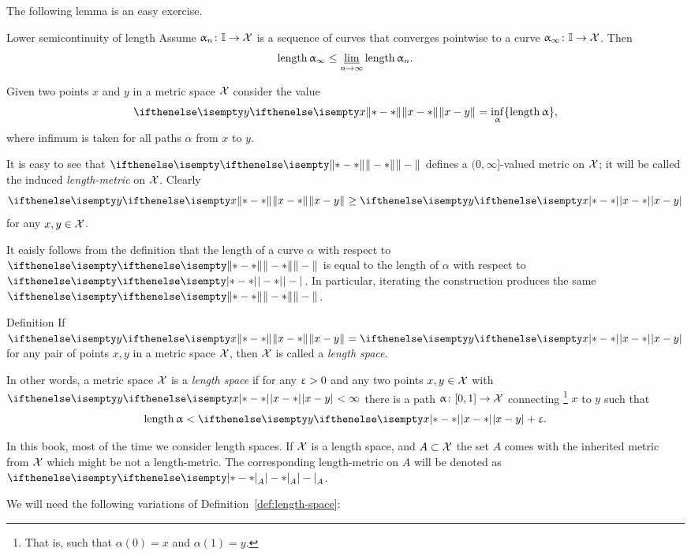 The following lemma is an easy exercise.

\begin{thm}{Lower semicontinuity of length}\label{thm:semicont-of-length}
Assume $\alpha_n\:\II\to \spc{X}$ is a sequence of curves that converges pointwise to a curve $\alpha_\infty\:\II\to \spc{X}$.
Then 
\[\length\alpha_\infty\le \liminf_{n\to\infty}\length\alpha_n.\]

\end{thm}

Given two points $x$ and $y$ in a metric space $\mathcal{X}$
consider the value
\[\yetdist{x}{y}{}=\inf_{\alpha}\{\length\alpha\},\]
where infimum is taken for all paths $\alpha$ from $x$ to $y$.

It is easy to see that $\yetdist{}{}{}$ defines a $(0,\infty]$-valued metric on  $\mathcal{X}$;
it will be called the induced \emph{length-metric} on $\mathcal{X}$.
Clearly 
\[\yetdist{x}{y}{}\ge \dist{x}{y}{}\]
for any $x,y\in \spc{X}$.

It  eaisly follows from the definition that the length of a curve $\alpha$ with respect to $\yetdist{}{}{}$ is equal to the length of $\alpha$ with respect to $\dist{}{}{}$. In particular, iterating the construction produces the same $\yetdist{}{}{}$.

\begin{thm}{Definition}\label{def:length-space}
If $\yetdist{x}{y}{}=\dist{x}{y}{}$ for any pair of points $x,y$ in a metric space $\mathcal{X}$, then $\mathcal{X}$ is called a \emph{length space}.
\end{thm}

In other words, a metric space $\mathcal{X}$ is a
\emph{length space}
if for any $\upvarepsilon>0$ and any two points $x,y\in \spc{X}$ with $\dist{x}{y}{}<\infty$ there is a path $\alpha\:[0,1]\to\spc{X}$ connecting%
\footnote{That is, such that $\alpha(0)=x$ and $\alpha(1)=y$.}
 $x$ to $y$
such that 
\[\length\alpha<\dist{x}{y}{}+\eps.\]

In this book, most of the time we consider length spaces.
If $\mathcal{X}$ is a length space, 
and $A\subset \spc{X}$ the set $A$ comes with the inherited metric from $\mathcal{X}$ 
which might be not a length-metric.
The corresponding length-metric on $A$ will be denoted as $\dist{}{}{A}$.

We will need the following variations of Definition~\ref{def:length-space}:

